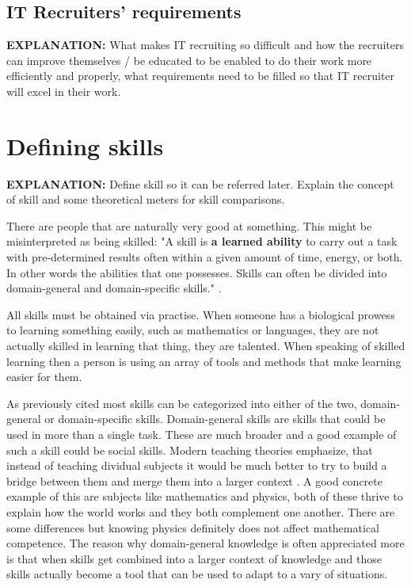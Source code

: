 \documentclass[11pt,a4paper,oneside,article]{memoir}
\begin{document}
\subsection{IT Recruiters' requirements}
\textbf{EXPLANATION:} What makes IT recruiting so difficult and how the recruiters can improve themselves / be educated to be enabled to do their work more efficiently and properly, what requirements need to be filled so that IT recruiter will excel in their work.

\section{Defining skills}
\textbf{EXPLANATION:} Define skill so it can be referred later. Explain the concept of skill and some theoretical meters for skill comparisons.

There are people that are naturally very good at something. This might be misinterpreted as being skilled: "A skill is \textbf{a learned ability} to carry out a task with pre-determined results often within a given amount of time, energy, or both. In other words the abilities that one possesses. Skills can often be divided into domain-general and domain-specific skills." \cite[p. ~4]{howland:book}.

All skills must be obtained via practise. When someone has a biological prowess to learning something easily, such as mathematics or languages, they are not actually skilled in learning that thing, they are talented. When speaking of skilled learning then a person is using an array of tools and methods that make learning easier for them.

As previously cited most skills can be categorized into either of the two, domain-general or domain-specific skills. Domain-general skills are skills that could be used in more than a single task. These are much broader and a good example of such a skill could be social skills. Modern teaching theories emphasize, that instead of teaching dividual subjects it would be much better to try to build a bridge between them and merge them into a larger context \cite{mansoor:article}. A good concrete example of this are subjects like mathematics and physics, both of these thrive to explain how the world works and they both complement one another. There are some differences but knowing physics definitely does not affect mathematical competence. The reason why domain-general knowledge is often appreciated more is that when skills get combined into a larger context of knowledge and those skills actually become a tool that can be used to adapt to a vary of situations.
\end{document}
